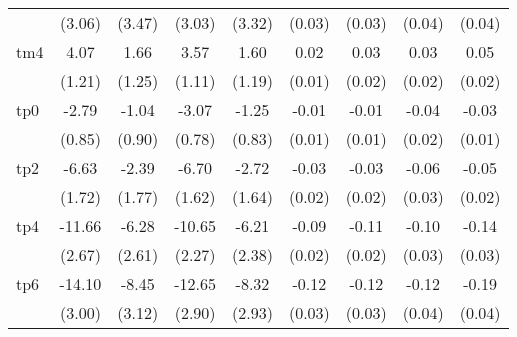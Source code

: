 {\begin{tabular}{l*{8}{c}}
                    &      (3.06)         &      (3.47)         &      (3.03)         &      (3.32)         &      (0.03)         &      (0.03)         &      (0.04)         &      (0.04)         \\
tm4                 &        4.07\sym{***}&        1.66         &        3.57\sym{**} &        1.60         &        0.02         &        0.03         &        0.03         &        0.05\sym{*}  \\
                    &      (1.21)         &      (1.25)         &      (1.11)         &      (1.19)         &      (0.01)         &      (0.02)         &      (0.02)         &      (0.02)         \\
tp0                 &       -2.79\sym{**} &       -1.04         &       -3.07\sym{***}&       -1.25         &       -0.01         &       -0.01         &       -0.04\sym{*}  &       -0.03\sym{*}  \\
                    &      (0.85)         &      (0.90)         &      (0.78)         &      (0.83)         &      (0.01)         &      (0.01)         &      (0.02)         &      (0.01)         \\
tp2                 &       -6.63\sym{***}&       -2.39         &       -6.70\sym{***}&       -2.72         &       -0.03         &       -0.03         &       -0.06\sym{*}  &       -0.05\sym{*}  \\
                    &      (1.72)         &      (1.77)         &      (1.62)         &      (1.64)         &      (0.02)         &      (0.02)         &      (0.03)         &      (0.02)         \\
tp4                 &      -11.66\sym{***}&       -6.28\sym{*}  &      -10.65\sym{***}&       -6.21\sym{**} &       -0.09\sym{***}&       -0.11\sym{***}&       -0.10\sym{**} &       -0.14\sym{***}\\
                    &      (2.67)         &      (2.61)         &      (2.27)         &      (2.38)         &      (0.02)         &      (0.02)         &      (0.03)         &      (0.03)         \\
tp6                 &      -14.10\sym{***}&       -8.45\sym{**} &      -12.65\sym{***}&       -8.32\sym{**} &       -0.12\sym{***}&       -0.12\sym{***}&       -0.12\sym{**} &       -0.19\sym{***}\\
                    &      (3.00)         &      (3.12)         &      (2.90)         &      (2.93)         &      (0.03)         &      (0.03)         &      (0.04)         &      (0.04)         \\

\end{tabular}}
